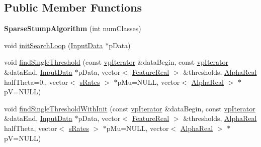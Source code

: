 \subsection*{Public Member Functions}
\begin{DoxyCompactItemize}
\item 
\hypertarget{classMultiBoost_1_1SparseStumpAlgorithm_aa2ad70e9068cab22c6af0ed764fd4145}{{\bfseries Sparse\-Stump\-Algorithm} (int num\-Classes)}\label{classMultiBoost_1_1SparseStumpAlgorithm_aa2ad70e9068cab22c6af0ed764fd4145}

\item 
void \hyperlink{classMultiBoost_1_1SparseStumpAlgorithm_af27dcfa5cac54e2b14c6b31093dd83b9}{init\-Search\-Loop} (\hyperlink{classMultiBoost_1_1InputData}{Input\-Data} $\ast$p\-Data)
\item 
void \hyperlink{classMultiBoost_1_1SparseStumpAlgorithm_a4856f7a704cc7345f713a3f225bebf1e}{find\-Single\-Threshold} (const \hyperlink{classMultiBoost_1_1SparseStumpAlgorithm_ac4d346756184d29c08539b2dde0c1d31}{vp\-Iterator} \&data\-Begin, const \hyperlink{classMultiBoost_1_1SparseStumpAlgorithm_ac4d346756184d29c08539b2dde0c1d31}{vp\-Iterator} \&data\-End, \hyperlink{classMultiBoost_1_1InputData}{Input\-Data} $\ast$p\-Data, vector$<$ \hyperlink{Defaults_8h_a3a11cfe6a5d469d921716ca6291e934f}{Feature\-Real} $>$ \&thresholds, \hyperlink{Defaults_8h_a80184c4fd10ab70a1a17c5f97dcd1563}{Alpha\-Real} half\-Theta=0., vector$<$ \hyperlink{structMultiBoost_1_1sRates}{s\-Rates} $>$ $\ast$p\-Mu=N\-U\-L\-L, vector$<$ \hyperlink{Defaults_8h_a80184c4fd10ab70a1a17c5f97dcd1563}{Alpha\-Real} $>$ $\ast$p\-V=N\-U\-L\-L)
\item 
void \hyperlink{classMultiBoost_1_1SparseStumpAlgorithm_a5430ca87fd6c89e3e1868326e2c54329}{find\-Single\-Threshold\-With\-Init} (const \hyperlink{classMultiBoost_1_1SparseStumpAlgorithm_ac4d346756184d29c08539b2dde0c1d31}{vp\-Iterator} \&data\-Begin, const \hyperlink{classMultiBoost_1_1SparseStumpAlgorithm_ac4d346756184d29c08539b2dde0c1d31}{vp\-Iterator} \&data\-End, \hyperlink{classMultiBoost_1_1InputData}{Input\-Data} $\ast$p\-Data, vector$<$ \hyperlink{Defaults_8h_a3a11cfe6a5d469d921716ca6291e934f}{Feature\-Real} $>$ \&thresholds, \hyperlink{Defaults_8h_a80184c4fd10ab70a1a17c5f97dcd1563}{Alpha\-Real} half\-Theta, vector$<$ \hyperlink{structMultiBoost_1_1sRates}{s\-Rates} $>$ $\ast$p\-Mu=N\-U\-L\-L, vector$<$ \hyperlink{Defaults_8h_a80184c4fd10ab70a1a17c5f97dcd1563}{Alpha\-Real} $>$ $\ast$p\-V=N\-U\-L\-L)
\end{DoxyCompactItemize}


